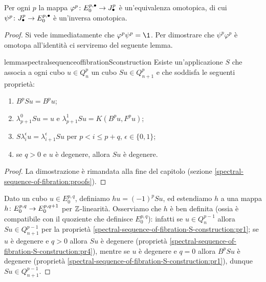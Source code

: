 \begin{proposition}
Per ogni \(p\) la mappa \(\map{\varphi^p}{E^{p,\bullet}_0}{J^p_\bullet}\) è un'equivalenza omotopica, di cui \(\map{\psi^p}{J^p_\bullet}{E^{p,\bullet}_0}\) è un'inversa omotopica.
\end{proposition}
\begin{proof}
Si vede immediatamente che \(\varphi^p\psi^p=\1\). Per dimostrare che \(\psi^p\varphi^p\) è omotopa all'identità ci serviremo del seguente lemma.
\begin{restatable}{lemma}{spectralsequenceoffibrationSconstruction}\label{spectral-sequence-of-fibration-S-construction}
Esiste un'applicazione \(S\) che associa a ogni cubo \(u\in Q^p_n\) un cubo \(Su\in Q^p_{n+1}\) e che soddisfa le seguenti proprietà:
\begin{enumerate}
\item\label{spectral-sequence-of-fibration-S-construction:pr1} \(B^pSu=B^pu\);
\item\label{spectral-sequence-of-fibration-S-construction:pr2} \(\lambda^0_{p+1}Su=u\) e \(\lambda^1_{p+1}Su=K(B^pu,F^pu)\);
\item\label{spectral-sequence-of-fibration-S-construction:pr3} \(S\lambda^\epsilon_iu=\lambda^\epsilon_{i+1}Su\) per \(p<i\le p+q\), \(\epsilon\in\{0,1\}\);
\item\label{spectral-sequence-of-fibration-S-construction:pr4} se \(q>0\) e \(u\) è degenere, allora \(Su\) è degenere.
\end{enumerate}
\end{restatable}
\begin{proof}
La dimostrazione è rimandata alla fine del capitolo (sezione \ref{spectral-sequence-of-fibration:proofs}).
\end{proof}
Dato un cubo \(u\in E^{p,q}_0\), definiamo \(hu=(-1)^pSu\), ed estendiamo \(h\) a una mappa
\(\map{h}{E^{p,q}_0}{E^{p,q+1}_0}\) per \(\mathbb{Z}\)-linearità. Osserviamo che \(h\) è ben definita (ossia è compatibile con il quoziente che definisce \(E^{p,q}_0\)): infatti se \(u\in Q^{p-1}_n\) allora \(Su\in Q^{p-1}_{n+1}\) per la proprietà \ref{spectral-sequence-of-fibration-S-construction:pr1}; se \(u\) è degenere e \(q>0\) allora \(Su\) è degenere (proprietà \ref{spectral-sequence-of-fibration-S-construction:pr4}), mentre se \(u\) è degenere e \(q=0\) allora \(B^pSu\) è degenere (proprietà \ref{spectral-sequence-of-fibration-S-construction:pr1}), dunque \(Su\in Q^{p-1}_{n+1}\).


\end{proof}
